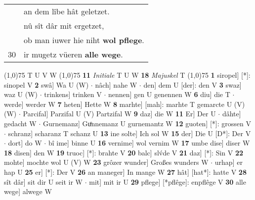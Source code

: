 \documentclass[8pt,a4paper,notitlepage]{article}
\begin{document}
\begin{table}[ht]
\begin{minipage}[t]{0.5\linewidth}
\begin{tabular}{rl}
 & an dem lîbe hât geletzet.\\ 
 & nû sît dâr mit ergetzet,\\ 
 & ob man iuwer hie niht \textbf{wol pflege}.\\ 
30 & ir mugetz vüeren \textbf{alle wege}.\\ 
\end{tabular}
\scriptsize
\line(1,0){75} \newline
T U V W \newline
\line(1,0){75} \newline
\textbf{11} \textit{Initiale} T U W  \textbf{18} \textit{Majuskel} T  \newline
\line(1,0){75} \newline
\textbf{1} siropel] [*]: sinopel V \textbf{2} swâ] Wa U (W)  $\cdot$ nâch] nahe W  $\cdot$ den] dem U [der]: den V \textbf{3} swaz] waz U (W)  $\cdot$ trinkens] trinken V  $\cdot$ nennen] gen U genennen W \textbf{6} diu] die T  $\cdot$ werde] werder W \textbf{7} heten] Hette W \textbf{8} marhte] [mah]: marhte T gemarcte U (V) (W)  $\cdot$ Parcifal] Parzifal U (V) Partzifal W \textbf{9} daz] die W \textbf{11} Er] Der U  $\cdot$ dâhte] gedacht W  $\cdot$ Gurnemanz] Guͦnnemanz U gurnemantz W \textbf{12} guoten] [*]: grossen V  $\cdot$ schranz] scharanz T schanz U \textbf{13} ine solte] Ich sol W \textbf{15} der] Die U [D*]: Der V  $\cdot$ dort] do W  $\cdot$ bî ime] binne U \textbf{16} vernime] wol vernim W \textbf{17} umbe dise] diser W \textbf{18} disen] den W \textbf{19} truoc] [*]: brahte V \textbf{20} balc] slv́de V \textbf{21} daz] [*]: Sin V \textbf{22} mohte] mochte wol U (V) W \textbf{23} grôzer wunder] Großes wunders W  $\cdot$ urhap] er hap U \textbf{25} er] [*]: Der V \textbf{26} an maneger] In mange W \textbf{27} hât] [hat*]: hatte V \textbf{28} sît dâr] sit dir U seit ir W  $\cdot$ mit] mit ir U \textbf{29} pflege] [*pflêge]: enpflêge V \textbf{30} alle wege] alwege W \newline
\end{minipage}
\end{table}
\end{document}
